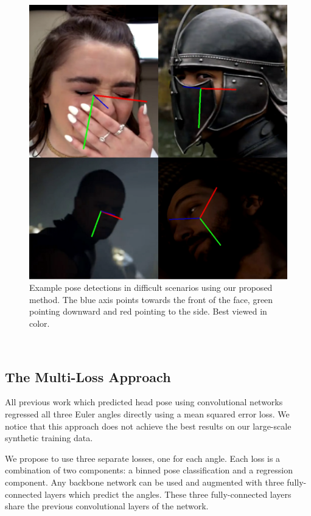 \documentclass[10pt,twocolumn,letterpaper]{article}
\begin{document}
\begin{figure}[t]
\begin{center}
   \includegraphics[width=1\linewidth]{examples_2.png}
\end{center}
   \caption{Example pose detections in difficult scenarios using our proposed method. The blue axis points towards the front of the face, green pointing downward and red pointing to the side. Best viewed in color.}
   \label{examples_1}
\end{figure}
\

\subsection{The Multi-Loss Approach}\label{sec3-B}

All previous work which predicted head pose using convolutional networks regressed all three Euler angles directly using a mean squared error loss. We notice that this approach does not achieve the best results on our large-scale synthetic training data.

We propose to use three separate losses, one for each angle. Each loss is a combination of two components: a binned pose classification and a regression component. Any backbone network can be used and augmented with three fully-connected layers which predict the angles. These three fully-connected layers share the previous convolutional layers of the network.
\end{document}
